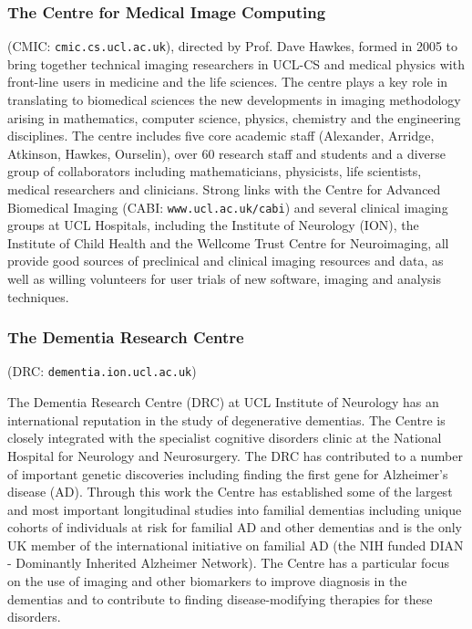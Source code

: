 \documentclass[a4paper,11pt]{article}
\begin{document}
\subsubsection*{The Centre for Medical Image Computing} (CMIC:
\verb+cmic.cs.ucl.ac.uk+), directed by Prof. Dave Hawkes, formed
in 2005 to bring together technical imaging researchers in UCL-CS and
medical physics with front-line users in medicine and the life
sciences. The centre plays a key role in translating to biomedical
sciences the new developments in imaging methodology arising in
mathematics, computer science, physics, chemistry and the engineering
disciplines. The centre includes five core academic staff (Alexander,
Arridge, Atkinson, Hawkes, Ourselin), over 60 research staff and
students and a diverse group of collaborators including
mathematicians, physicists, life scientists, medical researchers and
clinicians.  Strong links with the Centre for Advanced Biomedical
Imaging (CABI: \verb+www.ucl.ac.uk/cabi+) and several clinical imaging
groups at UCL Hospitals, including the Institute of Neurology (ION),
the Institute of Child Health and the Wellcome Trust Centre for
Neuroimaging, all provide good sources of preclinical and clinical
imaging resources and data, as well as willing volunteers for user
trials of new software, imaging and analysis techniques.

\subsubsection*{The Dementia Research Centre} (DRC: \verb+dementia.ion.ucl.ac.uk+)

The Dementia Research Centre (DRC) at UCL Institute of Neurology has
an international reputation in the study of degenerative dementias.
The Centre is closely integrated with the specialist cognitive
disorders clinic at the National Hospital for Neurology and
Neurosurgery. The DRC has contributed to a number of important genetic
discoveries including finding the first gene for Alzheimer's disease
(AD). Through this work the Centre has established some of the largest
and most important longitudinal studies into familial dementias
including unique cohorts of individuals at risk for familial AD and
other dementias and is the only UK member of the international
initiative on familial AD (the NIH funded DIAN - Dominantly Inherited
Alzheimer Network). The Centre has a particular focus on the use of
imaging and other biomarkers to improve diagnosis in the dementias and
to contribute to finding disease-modifying therapies for these
disorders.
\end{document}
